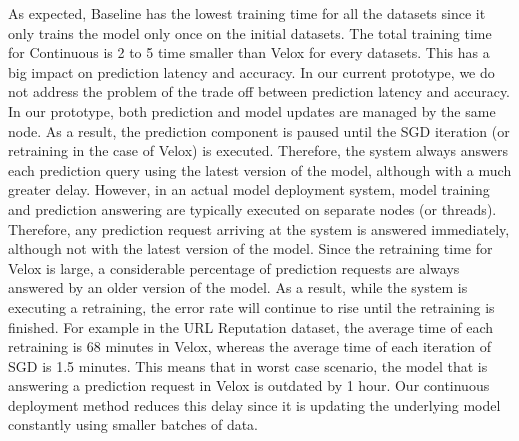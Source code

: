 As expected, Baseline has the lowest training time for all the datasets since it only trains the model only once on the initial datasets.
The total training time for Continuous is 2 to 5 time smaller than Velox for every datasets.
This has a big impact on prediction latency and accuracy.
In our current prototype, we do not address the problem of the trade off between prediction latency and accuracy.
In our prototype, both prediction and model updates are managed by the same node.
As a result, the prediction component is paused until the SGD iteration (or retraining in the case of Velox) is executed.
Therefore, the system always answers each prediction query using the latest version of the model, although with a much greater delay.
However, in an actual model deployment system, model training and prediction answering are typically executed on separate nodes (or threads).
Therefore, any prediction request arriving at the system is answered immediately, although not with the latest version of the model.
Since the retraining time for Velox is large, a considerable percentage of prediction requests are always answered by an older version of the model.
As a result, while the system is executing a retraining, the error rate will continue to rise until the retraining is finished.
For example in the URL Reputation dataset, the average time of each retraining is 68 minutes in Velox, whereas the average time of each iteration of SGD is 1.5 minutes.
This means that in worst case scenario, the model that is answering a prediction request in Velox is outdated by 1 hour.
Our continuous deployment method reduces this delay since it is updating the underlying model constantly using smaller batches of data.


